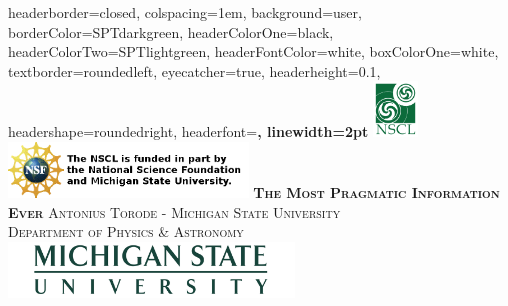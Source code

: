 \documentclass[landscape,a0paper,fontscale=0.28]{baposter} %
\begin{document}
\begin{poster}
{
headerborder=closed, %
colspacing=1em, %
background=user,
borderColor=SPTdarkgreen, %
headerColorOne=black, %
headerColorTwo=SPTlightgreen, %
headerFontColor=white, %
boxColorOne=white, %
textborder=roundedleft, %
eyecatcher=true, %
headerheight=0.1\textheight, %
headershape=roundedright, %
headerfont=\Large\bf\textsc, %
linewidth=2pt %
}
%
{\includegraphics[height=4em]{nscl.png}\includegraphics[height=4em]{nsftextlong.png}} %
{\bf\textsc{The Most Pragmatic Information Ever}\vspace{0.5em}} %
{\textsc{Antonius Torode -  \hspace{12pt} Michigan State University \\ Department of Physics \& Astronomy}} %
{\includegraphics[height=4em]{MSUwide.png}} %


\end{poster}
\end{document}
